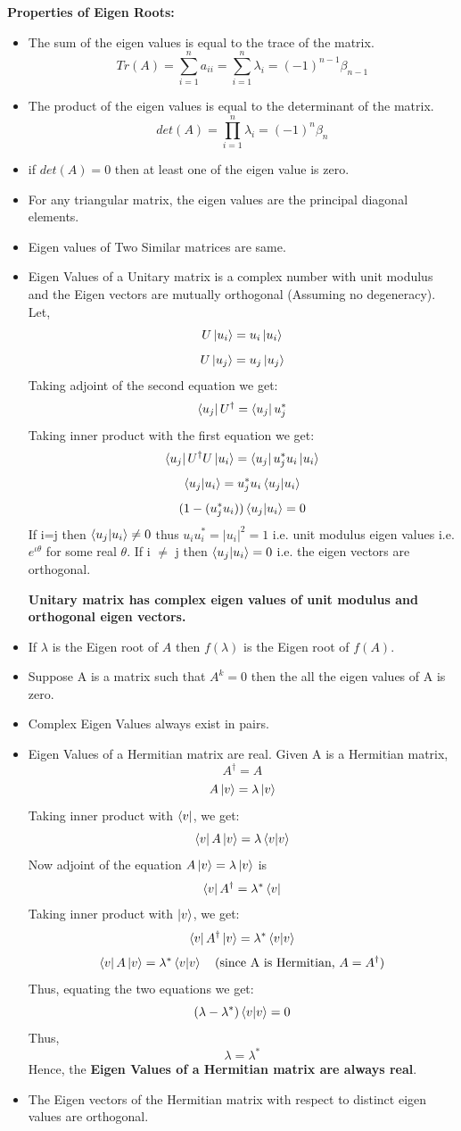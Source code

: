 \textbf{Properties of Eigen Roots: }
\begin{itemize}
    \item The sum of the eigen values is equal to the trace of the matrix.
    \[ Tr(A)=\sum_{i=1}^n a_{ii}=\sum_{i=1}^n \lambda_i = (-1)^{n-1}\beta_{n-1} \]
    \item The product of the eigen values is equal to the determinant of the matrix.
    \[ det(A)=\prod_{i=1}^n \lambda_i = (-1)^n\beta_{n} \]
    \item if $det(A)=0$ then at least one of the eigen value is zero.
    \item For any triangular matrix, the eigen values are the principal diagonal elements.
    \item Eigen values of Two Similar matrices are same.
    \item Eigen Values of a Unitary matrix is a complex number with unit modulus and the Eigen vectors are mutually orthogonal
    (Assuming no degeneracy).
    Let, 
    \[U\ket{u_i} = u_i\ket{u_i}\]
    \[U\ket{u_j} = u_j\ket{u_j}\]
    Taking adjoint of the second equation we get:
    \[ \bra{u_j}U^{\dagger}=\bra{u_j}u_j^* \]
    Taking inner product with the first equation we get:
    \[ \bra{u_j}U^{\dagger}U\ket{u_i}=\bra{u_j}u_j^*u_i\ket{u_i} \]
    \[ \braket{u_j|u_i}=u_j^*u_i \braket{u_j|u_i} \]
    \[ (1-(u_j^*u_i))\braket{u_j|u_i} = 0\]
    If i=j then $\braket{u_j|u_i} \neq 0$ thus $u_iu_i^*=|u_i|^2=1$ i.e. unit modulus eigen values i.e. $e^{\iota \theta}$ for some real $\theta$. If i $\neq$ j then $\braket{u_j|u_i}=0$ i.e. the eigen vectors are orthogonal.
    
    \textbf{Unitary matrix has complex eigen values of unit modulus and orthogonal eigen vectors.}
    
    \item If $\lambda$ is the Eigen root of $A$ then $f(\lambda)$ is the Eigen root of $f(A)$.
    \item Suppose A is a matrix such that $A^k=0$ then the all the eigen values of A is zero.
    \item Complex Eigen Values always exist in pairs.
    \item Eigen Values of a Hermitian matrix are real.
    Given A is a Hermitian matrix,
    \[ A^{\dagger}=A \]
    \[A\ket{v}=\lambda\ket{v} \]
    Taking inner product with $\bra{v}$, we get:
    \[\bra{v}A\ket{v}=\lambda\braket{v|v} \]
    Now adjoint of the equation $A\ket{v}=\lambda\ket{v}$ is
    \[ \bra{v}A^{\dagger}=\lambda^*\bra{v} \]
    Taking inner product with $\ket{v}$, we get:
    \[ \bra{v}A^{\dagger}\ket{v}=\lambda^*\braket{v|v} \]
    \[ \bra{v}A\ket{v}=\lambda^*\braket{v|v} \quad \text{(since A is Hermitian, $A=A^{\dagger} $)}\]
    Thus, equating the two equations we get:
    \[ (\lambda - \lambda^*) \braket{v|v}=0 \]
    Thus,
    \[ \lambda=\lambda^* \]
    Hence, the \textbf{Eigen Values of a Hermitian matrix are always real}.
    \item The Eigen vectors of the Hermitian matrix with respect to distinct eigen values are orthogonal.
    

\end{itemize}

